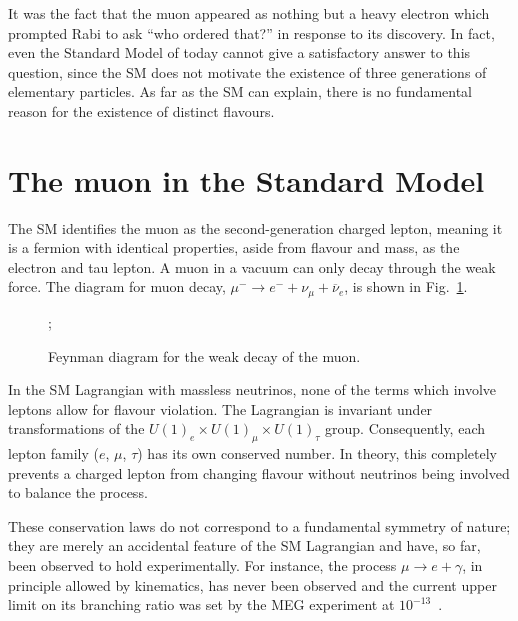 It was the fact that the muon appeared as nothing but a heavy electron which
prompted Rabi to ask ``who ordered that?'' in response to its discovery. In
fact, even the Standard Model of today cannot give a satisfactory answer to this
question, since the SM does not motivate the existence of three generations of
elementary particles. As far as the SM can explain, there is no fundamental reason
for the existence of distinct flavours.

\section{The muon in the Standard Model}
% 
The SM identifies the muon as the second-generation charged lepton, meaning it
is a fermion with identical properties, aside from flavour and mass, as the electron
and tau lepton. A muon in a vacuum can only decay through the weak force. The
diagram for muon decay, $\mu^- \rightarrow e^- +  \nu_\mu + \overline{\nu}_e$,
is shown in Fig.~\ref{fig:weak_decay}.


\begin{figure}
    \centering
    ;
    \caption{Feynman diagram for the weak decay of the muon.}
    \label{fig:weak_decay}
\end{figure}

In the SM Lagrangian with massless neutrinos, none of the terms which involve
leptons allow for flavour violation. The Lagrangian is invariant under
transformations of the ${U(1)_e \times U(1)_\mu \times U(1)_\tau}$ group.
Consequently, each lepton family ($e$, $\mu$, $\tau$) has its own conserved
number. In theory, this completely prevents a charged lepton from changing
flavour without neutrinos being involved to balance the process. 

These conservation laws do not correspond to a fundamental symmetry of nature;
they are merely an accidental feature of the SM Lagrangian and have, so far,
been observed to hold experimentally. For instance, the process ${\mu
\rightarrow e + \gamma}$, in principle allowed by kinematics, has never been
observed and the current upper limit on its branching ratio was set by the MEG
experiment at $10^{-13}$~\cite{mori2016final}.

